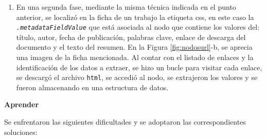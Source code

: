 \documentclass[
  12pt,
  openany]{book}
\providecommand{\tightlist}{%
  \setlength{\itemsep}{0pt}\setlength{\parskip}{0pt}}
\begin{document}
\begin{enumerate}
\def\labelenumi{\arabic{enumi}.}
\setcounter{enumi}{1}
\tightlist
\item
  En una segunda fase, mediante la misma técnica indicada en el punto anterior, se localizó en la ficha de un trabajo la etiqueta css, en este caso la \emph{\texttt{.metadataFieldValue}} que está asociada al nodo que contiene los valores del: título, autor, fecha de publicación, palabras clave, enlace de descarga del documento y el texto del resumen. En la Figura \ref{fig:nodosurl}-b, se aprecia una imagen de la ficha mencionada. Al contar con el listado de enlaces y la identificación de los datos a extraer, se hizo un bucle para visitar cada enlace, se descargó el archivo \texttt{html}, se accedió al nodo, se extrajeron los valores y se fueron almacenando en una estructura de datos.
\end{enumerate}

\textbf{Aprender}

Se enfrentaron las siguientes dificultades y se adoptaron las correspondientes soluciones:
\end{document}
